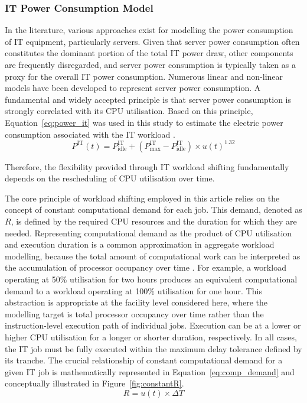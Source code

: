 \documentclass[lettersize,journal]{IEEEtran}
\newcommand{\rev}[1]{#1}
\begin{document}
\subsubsection{IT Power Consumption Model}

 In the literature, various approaches exist for modelling the power consumption of IT equipment, particularly servers. Given that server power consumption often constitutes the dominant portion of the total IT power draw, other components are frequently disregarded, and server power consumption is typically taken as a proxy for the overall IT power consumption. Numerous linear and non-linear models have been developed to represent server power consumption. A fundamental and widely accepted principle is that server power consumption is strongly correlated with its CPU utilisation. \rev{Based on this principle,} Equation~\eqref{eq:power_it} was used in this study to estimate the electric power consumption associated with the IT workload \cite{dayarathna2015data,v2015analysis}.
\begin{equation}
P^{\mathrm{IT}}(t) = P^{\mathrm{IT}}_{\mathrm{idle}} + (P^{\mathrm{IT}}_{\mathrm{max}} - P^{\mathrm{IT}}_{\mathrm{idle}}) \times u(t)^{1.32}
\label{eq:power_it}
\end{equation}



Therefore, the flexibility provided through IT workload shifting fundamentally depends on the rescheduling of CPU utilisation over time.

The core principle of workload shifting employed in this article relies on the concept of constant computational demand for each job. This demand, denoted as $R$, is defined by the required CPU resources and the duration for which they are needed. \rev{Representing computational demand as the product of CPU utilisation and execution duration is a common approximation in aggregate workload modelling, because the total amount of computational work can be interpreted as the accumulation of processor occupancy over time \cite{dayarathna2015data,6779441,Cao2022ApEn}. For example, a workload operating at 50\% utilisation for two hours produces an equivalent computational demand to a workload operating at 100\% utilisation for one hour. This abstraction is appropriate at the facility level considered here, where the modelling target is total processor occupancy over time rather than the instruction-level execution path of individual jobs.} Execution can be at a lower or higher CPU utilisation for a longer or shorter duration, respectively. In all cases, the IT job must be fully executed within the maximum delay tolerance defined by its tranche. The crucial relationship of constant computational demand for a given IT job is mathematically represented in Equation~\eqref{eq:comp_demand} and conceptually illustrated in Figure~\ref{fig:constantR}.
\begin{equation}
R = u(t) \times \Delta T
\label{eq:comp_demand}
\end{equation}
\end{document}
